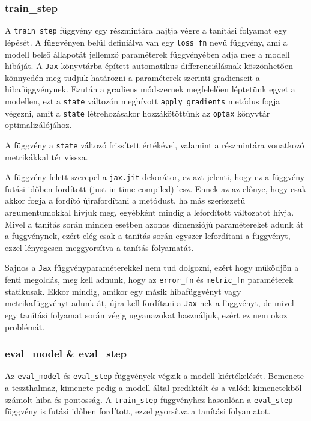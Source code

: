 \subsubsection{train\_step}
A \texttt{train\_step} függvény egy részmintára hajtja végre a tanítási folyamat egy lépését.
A függvényen belül definiálva van egy \texttt{loss\_fn} nevű függvény, ami a modell belső állapotát
jellemző paraméterek függvényében adja meg a modell hibáját. A \texttt{Jax} könyvtárba épített
automatikus differenciálásnak köszönhetően könnyedén meg tudjuk határozni a paraméterek szerinti gradienseit
a hibafüggvénynek. Ezután a gradiens módszernek megfelelően léptetünk egyet a modellen, ezt a \texttt{state}
változón meghívott \texttt{apply\_gradients} metódus fogja végezni, amit a \texttt{state} létrehozásakor
hozzákötöttünk az \texttt{optax} könyvtár optimalizálójához.

A függvény a \texttt{state} változó frissített értékével, valamint a részmintára
vonatkozó metrikákkal tér vissza.

A függvény felett szerepel a \texttt{jax.jit} dekorátor, ez azt jelenti, hogy ez a függvény
futási időben fordított (just-in-time compiled) lesz. Ennek az az előnye, hogy csak akkor 
fogja a fordító újrafordítani a metódust, ha más szerkezetű argumentumokkal hívjuk meg,
egyébként mindig a lefordított változatot hívja.
Mivel a tanítás során minden esetben azonos dimenziójú paramétereket adunk át a függvénynek,
ezért elég csak a tanítás során egyszer lefordítani a függvényt, ezzel lényegesen
meggyorsítva a tanítás folyamatát.

Sajnos a \texttt{Jax} függvényparaméterekkel nem tud dolgozni, ezért hogy működjön a fenti megoldás,
meg kell adnunk, hogy az \texttt{error\_fn} és \texttt{metric\_fn} paraméterek statikusak. Ekkor
mindig, amikor egy másik hibafüggvényt vagy metrikafüggvényt adunk át, újra kell fordítani a
\texttt{Jax}-nek a függvényt, de mivel egy tanítási folyamat során végig ugyanazokat használjuk,
ezért ez nem okoz problémát.

\subsubsection{eval\_model \& eval\_step}
Az \texttt{eval\_model} és \texttt{eval\_step} függvények végzik a modell kiértékelését.
Bemenete a teszthalmaz, kimenete pedig a modell által prediktált és a valódi
kimenetekből számolt hiba és pontosság. A \texttt{train\_step} függvényhez hasonlóan
a \texttt{eval\_step} függvény is futási időben fordított, ezzel gyorsítva a tanítási folyamatot.

